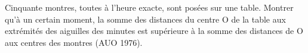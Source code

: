 Cinquante montres, toutes à l'heure exacte, sont posées sur une table. Montrer qu'à un certain moment, la somme des distances du centre O de la table aux extrémités des aiguilles des minutes est supérieure à la somme des distances de O aux centres des montres (AUO 1976).
